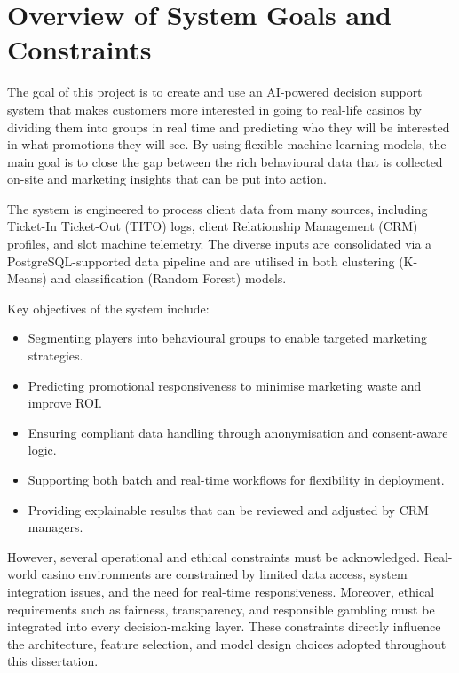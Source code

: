 \documentclass[12pt,a4paper]{report}
\begin{document}
\section{Overview of System Goals and Constraints}

The goal of this project is to create and use an AI-powered decision support system that makes customers more interested in going to real-life casinos by dividing them into groups in real time and predicting who they will be interested in what promotions they will see.  By using flexible machine learning models, the main goal is to close the gap between the rich behavioural data that is collected on-site and marketing insights that can be put into action.

The system is engineered to process client data from many sources, including Ticket-In Ticket-Out (TITO) logs, client Relationship Management (CRM) profiles, and slot machine telemetry.  The diverse inputs are consolidated via a PostgreSQL-supported data pipeline and are utilised in both clustering (K-Means) and classification (Random Forest) models.

Key objectives of the system include:

\begin{itemize}
  \item Segmenting players into behavioural groups to enable targeted marketing strategies.
  \item Predicting promotional responsiveness to minimise marketing waste and improve ROI.
  \item Ensuring compliant data handling through anonymisation and consent-aware logic.
  \item Supporting both batch and real-time workflows for flexibility in deployment.
  \item Providing explainable results that can be reviewed and adjusted by CRM managers.
\end{itemize}

However, several operational and ethical constraints must be acknowledged. Real-world casino environments are constrained by limited data access, system integration issues, and the need for real-time responsiveness. Moreover, ethical requirements such as fairness, transparency, and responsible gambling must be integrated into every decision-making layer. These constraints directly influence the architecture, feature selection, and model design choices adopted throughout this dissertation.
\end{document}
